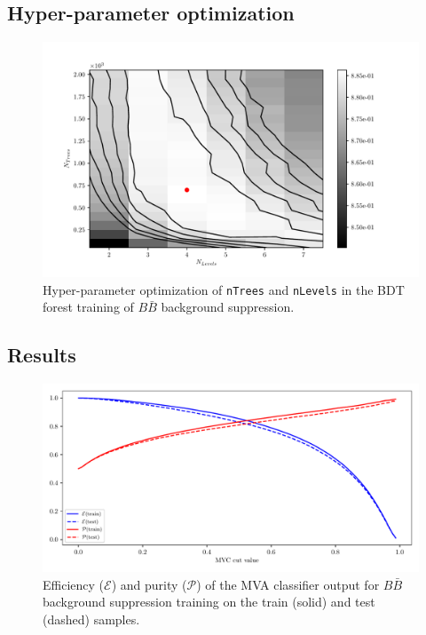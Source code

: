 \subsection*{Hyper-parameter optimization}

\begin{figure}[H]
\centering
\captionsetup{width=0.8\linewidth}
\includegraphics[width=\linewidth]{fig/addendums/BBcC_hpo}
\caption{Hyper-parameter optimization of \texttt{nTrees} and \texttt{nLevels} in the BDT forest training of $B\bar B$ background suppression.}
\end{figure}

\subsection*{Results}

\begin{figure}[H]
\centering
\captionsetup{width=0.8\linewidth}
\includegraphics[width=\linewidth]{fig/addendums/BBcC_effpur}
\caption{Efficiency ($\mathcal{E}$) and purity ($\mathcal{P}$) of the MVA classifier output for $B\bar B$ background suppression training on the train (solid) and test (dashed) samples.}
\end{figure}

